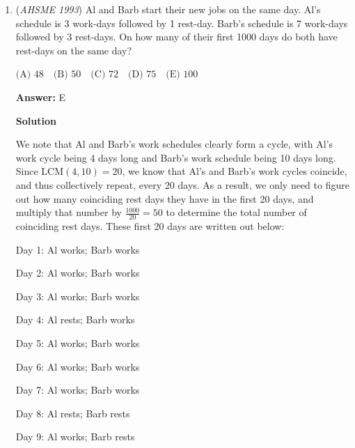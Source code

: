 \begin{enumerate}
 
This makes the area of each $t = \frac{1}{2}\cdot b \cdot h = \frac{1}{2}\cdot 1 \cdot \frac{1}{\sqrt3} =  \frac{1}{2\sqrt3}$

 
The total area comprises $4q+8t$, so 
 \[4q+(8\cdot \frac{1}{2\sqrt3}) = 2^2=4\]

 \[4q + \frac{4}{\sqrt3} = 4\]

 \[4q = 4 - \frac{4}{\sqrt3}\]

 \[q = 1 - \frac{1}{\sqrt3} = \frac{\sqrt3 - 1 }{\sqrt3}\]

 \[\frac{q}{t} = \frac{\frac{\sqrt3 - 1 }{\sqrt3}}{\frac{1}{2\sqrt3}} = 2\cdot (\sqrt3 - 1) = \boxed{2\sqrt3-2}\]
$\fbox{A}$



	\item (\textit{AHSME 1993}) Al and Barb start their new jobs on the same day. Al's schedule is 3 work-days followed by 1 rest-day. Barb's schedule is 7 work-days followed by 3 rest-days. On how many of their first 1000 days do both have rest-days on the same day?


 $\text{(A) } 48\quad \text{(B) } 50\quad \text{(C) } 72\quad \text{(D) } 75\quad \text{(E) } 100$

 \textbf{Answer: }E



\textbf{Solution}

We note that Al and Barb's work schedules clearly form a cycle, with Al's work cycle being 4 days long and Barb's work schedule being 10 days long.  Since $\text{LCM}\left(4,10\right)=20$, we know that Al's and Barb's work cycles coincide, and thus collectively repeat, every 20 days.  As a result, we only need to figure out how many coinciding rest days they have in the first 20 days, and multiply that number by $\frac{1000}{20}=50$ to determine the total number of coinciding rest days.  These first 20 days are written out below:

 Day 1:  Al works; Barb works

 Day 2:  Al works; Barb works

 Day 3:  Al works; Barb works

 Day 4:  Al rests; Barb works

 Day 5:  Al works; Barb works

 Day 6:  Al works; Barb works

 Day 7:  Al works; Barb works

 Day 8:  Al rests; Barb rests

 Day 9:  Al works; Barb rests


\end{enumerate}
